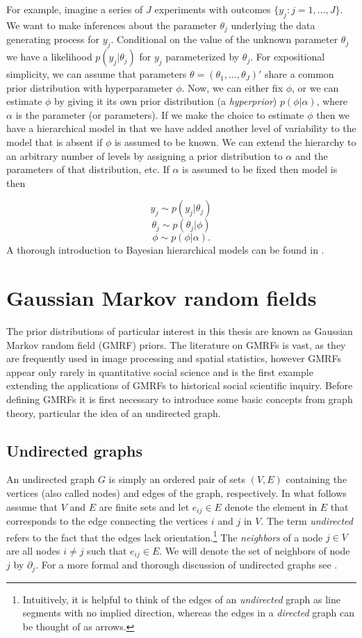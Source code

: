 For example, imagine a series of $J$ experiments with outcomes $\{y_j : j = 1, \dots, J\}$. We want to make inferences about the parameter $\theta_j$ underlying the data generating process for $y_j$. Conditional on the value of the unknown parameter $\theta_j$ we have a likelihood $p(y_j | \theta_j)$ for $y_j$  parameterized by $\theta_j$.  For expositional simplicity, we can assume that parameters $\theta = (\theta_1, \dots, \theta_J)'$ share a common prior distribution with hyperparameter $\phi$. Now, we can either fix $\phi$, or we can estimate $\phi$ by giving it its own prior distribution (a {\it hyperprior}) $p(\phi | \alpha)$, where $\alpha$ is the parameter (or parameters). If we make the choice to estimate $\phi$ then we have a hierarchical model in that we have added another level of variability to the model that is absent if $\phi$ is assumed to be known. We can extend the hierarchy to an arbitrary number of levels by assigning a prior distribution to $\alpha$ and the parameters of that distribution, etc. If $\alpha$ is assumed to be fixed then model is then

{\singlespacing
$$y_j \sim p(y_j | \theta_j)$$
$$\theta_j \sim p(\theta_j | \phi)$$
$$\phi \sim p(\phi | \alpha).$$
}
%
A thorough introduction to Bayesian hierarchical models can be found in . 




\section{Gaussian Markov random fields}

The prior distributions of particular interest in this thesis are known as Gaussian Markov random field (GMRF) priors. The literature on GMRFs is vast, as they are frequently used in image processing and spatial statistics, however  GMRFs appear only rarely in quantitative social science and  is the first example extending the applications of GMRFs to historical social scientific inquiry. Before defining GMRFs it is first necessary to introduce some basic concepts from graph theory, particular the idea of an undirected graph. 

\subsection{Undirected graphs}
 An undirected graph $G$ is simply an ordered pair of sets $(V,E)$ containing the vertices (also called nodes) and edges of the graph, respectively. In what follows assume that $V$ and $E$ are finite sets and let $e_{ij} \in E$ denote the element in $E$ that corresponds to the edge connecting the vertices $i$ and $j$ in $V$. The term {\it undirected} refers to the fact that the edges lack orientation.\footnote{Intuitively, it is helpful to think of the edges of  an {\it undirected} graph as line segments with no implied direction, whereas the edges in a {\it directed} graph can be thought of as arrows.} The {\it neighbors} of a node $j \in V$ are all nodes $i \neq j$ such that $e_{ij} \in E$. We will denote the set of neighbors of node $j$ by $\partial_j$. For a more formal and thorough discussion of undirected graphs see . 

